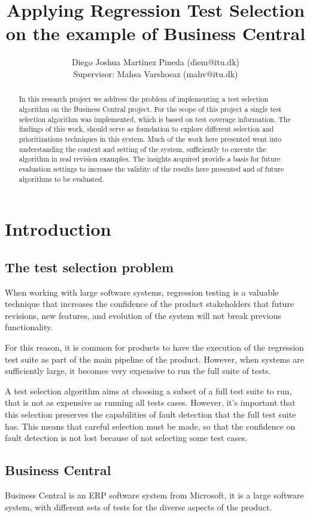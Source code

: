 \documentclass{article}
\title{Applying Regression Test Selection on the example of Business Central}
\author{Diego Joshua Martinez Pineda (diem@itu.dk)\\Supervisor: Mahsa Varshosaz (mahv@itu.dk)}
\begin{document}
\maketitle

\begin{abstract}
In this research project we address the problem of implementing a test selection algorithm on the Business Central project. For the scope of this project a single test selection algorithm was implemented, which is based on test coverage information. The findings of this work, should serve as foundation to explore different selection and prioritizations techniques in this system. Much of the work here presented went into understanding the context and setting of the system, sufficiently to execute the algorithm in real revision examples. The insights acquired provide a basis for future evaluation settings to increase the validity of the results here presented and of future algorithms to be evaluated.
\end{abstract}

\section{Introduction}
\subsection{The test selection problem}
   When working with large software systems, regression testing is a valuable technique that increases the confidence of the product stakeholders that future revisions, new features, and evolution of the system will not break previous functionality.

   For this reason, it is common for products to have the execution of the regression test suite as part of the main pipeline of the product. However, when systems are sufficiently large, it becomes very expensive to run the full suite of tests.

   A test selection algorithm aims at choosing a subset of a full test suite to run, that is not as expensive as running all tests cases. However, it's important that this selection preserves the capabilities of fault detection that the full test suite has. This means that careful selection must be made, so that the confidence on fault detection is not lost because of not selecting some test cases.

\subsection{Business Central}
   Business Central is an ERP software system from Microsoft, it is a large software system, with different sets of tests for the diverse aspects of the product.
\end{document}
